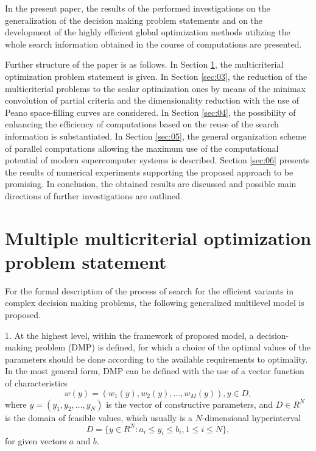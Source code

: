 \documentclass{svproc}
\begin{document}
In the present paper, the results of the performed investigations on the generalization of the decision making problem statements \cite{x11,x12} and on the development of the highly efficient global optimization methods utilizing the whole search information obtained in the course of computations \cite{x13,x14,x15,x16,x17} are presented. 

Further structure of the paper is as follows. In Section \ref{sec:02}, the multicriterial optimization problem statement is given. In Section \ref{sec:03}, the reduction of the multicriterial problems to the scalar optimization ones by means of the minimax convolution of partial criteria and the dimensionality reduction with the use of Peano space-filling curves are considered. In Section \ref{sec:04}, the possibility of enhancing the efficiency of computations based on the reuse of the search information is substantiated. In Section \ref{sec:05}, the general organization scheme of parallel computations allowing the maximum use of the computational potential of modern supercomputer systems is described. Section \ref{sec:06} presents the results of numerical experiments supporting the proposed approach to be promising. In conclusion, the obtained results are discussed and possible main directions of further investigations are outlined.


\section{Multiple multicriterial optimization problem statement}
\label{sec:02}
For the formal description of the process of search for the efficient variants in complex decision making problems, the following generalized multilevel model is proposed.

1. At the highest level, within the framework of proposed model, a decision-making problem (DMP) is defined, for which a choice of the optimal values of the parameters should be done according to the available requirements to optimality. In the most general form, DMP can be defined with the use of a vector function of characteristics 
\begin{equation}
\label{eq:01}
w(y)=(w_1(y), w_2(y), \dots, w_M(y)), y \in D,
\end{equation}
where $y=(y_1,y_2, \dots ,y_N)$ is the vector of constructive parameters, and $D \in R^N$ is the domain of feasible values, which usually is a $N$-dimensional hyperinterval
\begin{equation}
\label{eq:02}
D=\{ y\in R^N : a_i \leq y_i \leq b_i,1 \leq i \leq N \},
\end{equation}
for given vectors $a$ and $b$. 
\end{document}

